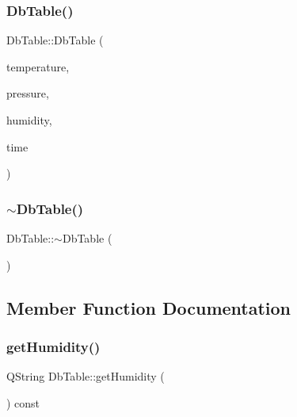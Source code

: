 \subsubsection{\texorpdfstring{Db\+Table()}{DbTable()}}
{\footnotesize\ttfamily Db\+Table\+::\+Db\+Table (\begin{DoxyParamCaption}\item[{Q\+String}]{temperature,  }\item[{Q\+String}]{pressure,  }\item[{Q\+String}]{humidity,  }\item[{Q\+String}]{time }\end{DoxyParamCaption})}

\mbox{\label{class_db_table_a3b61984342738abc45b6074e970eeb55}} 
\subsubsection{\texorpdfstring{$\sim$\+Db\+Table()}{~DbTable()}}
{\footnotesize\ttfamily Db\+Table\+::$\sim$\+Db\+Table (\begin{DoxyParamCaption}{ }\end{DoxyParamCaption})}



\subsection{Member Function Documentation}
\mbox{\label{class_db_table_ad14c292fe435fe7b86f48554c75da206}} 
\subsubsection{\texorpdfstring{get\+Humidity()}{getHumidity()}}
{\footnotesize\ttfamily Q\+String Db\+Table\+::get\+Humidity (\begin{DoxyParamCaption}{ }\end{DoxyParamCaption}) const}

\mbox{\label{class_db_table_afdc8c975dce8cfd9d578931252eb75cd}} 
